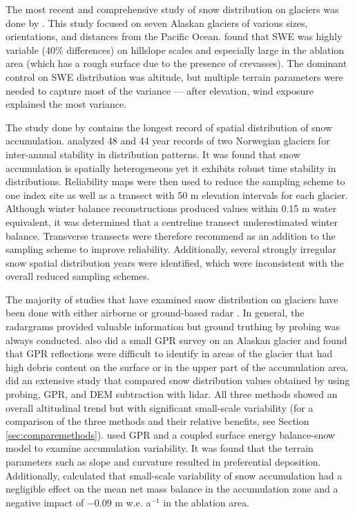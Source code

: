 \documentclass[12pt]{article}
\begin{document}
The most recent and comprehensive study of snow distribution on glaciers was done by \cite{McGrath2015}. This study focused on seven Alaskan glaciers of various sizes, orientations, and distances from the Pacific Ocean. \cite{McGrath2015} found that SWE was highly variable (40$\%$ differences) on hillslope scales and especially large in the ablation area (which has a rough surface due to the presence of crevasses). The dominant control on SWE distribution was altitude, but multiple terrain parameters were needed to capture most of the variance --- after elevation, wind exposure explained the most variance. 

The study done by \cite{Walmsley2015} contains the longest record of spatial distribution of snow accumulation. \cite{Walmsley2015} analyzed 48 and 44 year records of two Norwegian glaciers for inter-annual stability in distribution patterns. It was found that snow accumulation is spatially heterogeneous yet it exhibits robust time stability in distributions. Reliability maps were then used to reduce the sampling scheme to one index site as well as a transect with 50 m elevation intervals for each glacier. Although winter balance reconstructions produced values within 0.15 m water equivalent, it was determined that a centreline transect underestimated winter balance. Transverse transects were therefore recommend as an addition to the sampling scheme to improve reliability. Additionally, several strongly irregular snow spatial distribution years were identified, which were inconsistent with the overall reduced sampling schemes. 

The majority of studies that have examined snow distribution on glaciers have been done with either airborne or ground-based radar \citep[e.g.][]{Winther1998,Machguth2006, Grabiec2011, Pelt2014,McGrath2015}. In general, the radargrams provided valuable information but ground truthing by probing was always conducted. \cite{Gusmeroli2014} also did a small GPR survey on an Alaskan glacier and found that GPR reflections were difficult to identify in areas of the glacier that had high debris content on the surface or in the upper part of the accumulation area. \cite{Sold2013} did an extensive study that compared snow distribution values obtained by using probing, GPR, and DEM subtraction with lidar. All three methods showed an overall altitudinal trend but with significant small-scale variability (for a comparison of the three methods and their relative benefits, see Section \ref{sec:comparemethods}). \cite{Pelt2014} used GPR and a coupled surface energy balance-snow model to examine accumulation variability. It was found that the terrain parameters such as slope and curvature resulted in preferential deposition. Additionally, \cite{Pelt2014} calculated that small-scale variability of snow accumulation had a negligible effect on the mean net mass balance in the accumulation zone and a negative impact of $-$0.09 m w.e. a$^{-1}$ in the ablation area.
\end{document}
